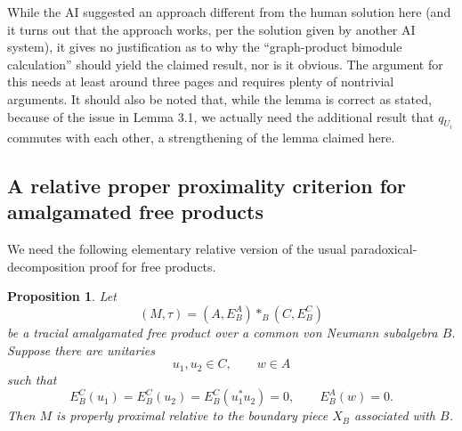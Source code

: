 \documentclass[12pt]{article}
\newtheorem{proposition}[theorem]{Proposition}
\theoremstyle{definition}
\newcommand{\freeprod}{\mathop{*}}
\newcommand{\review}[1]{\begin{reviewbox}#1\end{reviewbox}}
\begin{document}
\review{While the AI suggested an approach different from the human solution here (and it turns out that the approach works, per the solution given by another AI system), it gives no justification as to why the ``graph-product bimodule calculation'' should yield the claimed result, nor is it obvious. The argument for this needs at least around three pages and requires plenty of nontrivial arguments. It should also be noted that, while the lemma is correct as stated, because of the issue in Lemma 3.1, we actually need the additional result that $q_{U_i}$ commutes with each other, a strengthening of the lemma claimed here.}

\subsection{A relative proper proximality criterion for amalgamated free products}

We need the following elementary relative version of the usual paradoxical-decomposition proof for free products.

\begin{proposition}\label{prop:AFP}
Let
\[
(M,\tau)=(A,E_B^A)\freeprod_B(C,E_B^C)
\]
be a tracial amalgamated free product over a common von Neumann subalgebra $B$.  Suppose there are unitaries
\[
u_1,u_2\in C,\qquad w\in A
\]
such that
\[
E_B^C(u_1)=E_B^C(u_2)=E_B^C(u_1^*u_2)=0,
\qquad
E_B^A(w)=0.
\]
Then $M$ is properly proximal relative to the boundary piece $X_B$ associated with $B$.
\end{proposition}
\end{document}
